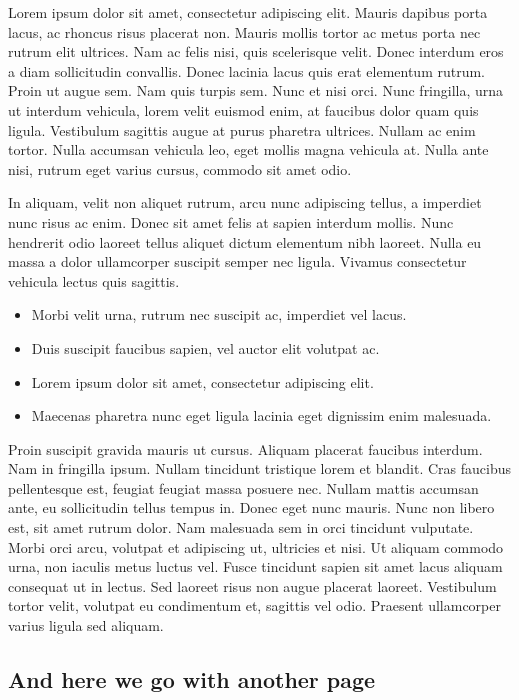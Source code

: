 \documentclass[11pt,oneside,openany]{book}
\begin{document}
Lorem ipsum dolor sit amet, consectetur adipiscing elit. Mauris dapibus porta lacus, ac rhoncus risus placerat non. Mauris mollis tortor ac metus porta nec rutrum elit ultrices. Nam ac felis nisi, quis scelerisque velit. Donec interdum eros a diam sollicitudin convallis. Donec lacinia lacus quis erat elementum rutrum. Proin ut augue sem. Nam quis turpis sem. Nunc et nisi orci. Nunc fringilla, urna ut interdum vehicula, lorem velit euismod enim, at faucibus dolor quam quis ligula. Vestibulum sagittis augue at purus pharetra ultrices. Nullam ac enim tortor. Nulla accumsan vehicula leo, eget mollis magna vehicula at. Nulla ante nisi, rutrum eget varius cursus, commodo sit amet odio.

In aliquam, velit non aliquet rutrum, arcu nunc adipiscing tellus, a imperdiet nunc risus ac enim. Donec sit amet felis at sapien interdum mollis. Nunc hendrerit odio laoreet tellus aliquet dictum elementum nibh laoreet. Nulla eu massa a dolor ullamcorper suscipit semper nec ligula. Vivamus consectetur vehicula lectus quis sagittis.

\begin{itemize}
\item Morbi velit urna, rutrum nec suscipit ac, imperdiet vel lacus.
\item Duis suscipit faucibus sapien, vel auctor elit volutpat ac.
\item Lorem ipsum dolor sit amet, consectetur adipiscing elit.
\item Maecenas pharetra nunc eget ligula lacinia eget dignissim enim malesuada.
\end{itemize}

Proin suscipit gravida mauris ut cursus. Aliquam placerat faucibus interdum. Nam in fringilla ipsum. Nullam tincidunt tristique lorem et blandit. Cras faucibus pellentesque est, feugiat feugiat massa posuere nec. Nullam mattis accumsan ante, eu sollicitudin tellus tempus in. Donec eget nunc mauris. Nunc non libero est, sit amet rutrum dolor. Nam malesuada sem in orci tincidunt vulputate. Morbi orci arcu, volutpat et adipiscing ut, ultricies et nisi. Ut aliquam commodo urna, non iaculis metus luctus vel. Fusce tincidunt sapien sit amet lacus aliquam consequat ut in lectus. Sed laoreet risus non augue placerat laoreet. Vestibulum tortor velit, volutpat eu condimentum et, sagittis vel odio. Praesent ullamcorper varius ligula sed aliquam.	

\subsection{And here we go with another page}\hypertarget{and-here-we-go-with-another-page}{}\label{and-here-we-go-with-another-page}
\end{document}
